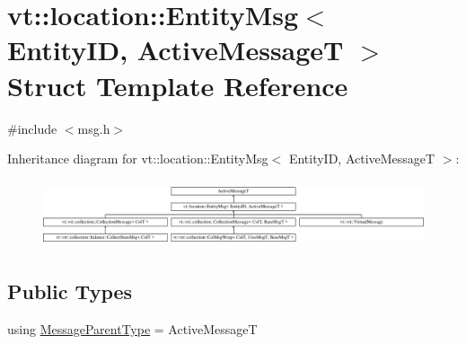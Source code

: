 \hypertarget{structvt_1_1location_1_1_entity_msg}{}\section{vt\+:\+:location\+:\+:Entity\+Msg$<$ Entity\+ID, Active\+MessageT $>$ Struct Template Reference}
\label{structvt_1_1location_1_1_entity_msg}


{\ttfamily \#include $<$msg.\+h$>$}

Inheritance diagram for vt\+:\+:location\+:\+:Entity\+Msg$<$ Entity\+ID, Active\+MessageT $>$\+:\begin{figure}[H]
\begin{center}
\leavevmode
\includegraphics[height=1.996435cm]{structvt_1_1location_1_1_entity_msg}
\end{center}
\end{figure}
\subsection*{Public Types}
\begin{DoxyCompactItemize}
\item 
using \hyperlink{structvt_1_1location_1_1_entity_msg_a186637100a628eb04cb00127f5579210}{Message\+Parent\+Type} = Active\+MessageT
\end{DoxyCompactItemize}
